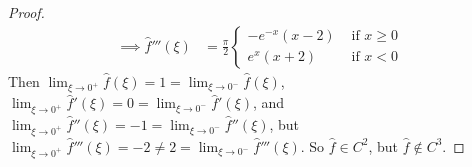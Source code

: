 \documentclass{article} %
\theoremstyle{plain}
\numberwithin{equation}{section} %
\numberwithin{figure}{section} %
\numberwithin{table}{section} %
\begin{document}
\begin{proof}
\begin{align*}
        \implies \widehat{f}'''(\xi) &= \frac{\pi}{2}\begin{cases}
            -e^{-x}(x - 2) & \text{ if } x \geq 0 \\
            e^{x}(x + 2) & \text{ if } x < 0
        \end{cases}
    \end{align*}
    Then $\displaystyle \lim_{\xi \rightarrow 0^+}\widehat{f}(\xi) = 1 = \lim_{\xi \rightarrow 0^-}\widehat{f}(\xi)$, $\displaystyle \lim_{\xi \rightarrow 0^+}\widehat{f}'(\xi) = 0 = \lim_{\xi \rightarrow 0^-}\widehat{f}'(\xi)$, and $\displaystyle \lim_{\xi \rightarrow 0^+}\widehat{f}''(\xi) = -1 = \lim_{\xi \rightarrow 0^-}\widehat{f}''(\xi)$, but $\displaystyle \lim_{\xi \rightarrow 0^+}\widehat{f}'''(\xi) = -2 \neq 2 = \lim_{\xi \rightarrow 0^-}\widehat{f}'''(\xi)$.  So $\widehat{f} \in C^2$, but $\widehat{f} \not\in C^3$.
\end{proof}
\end{document}

